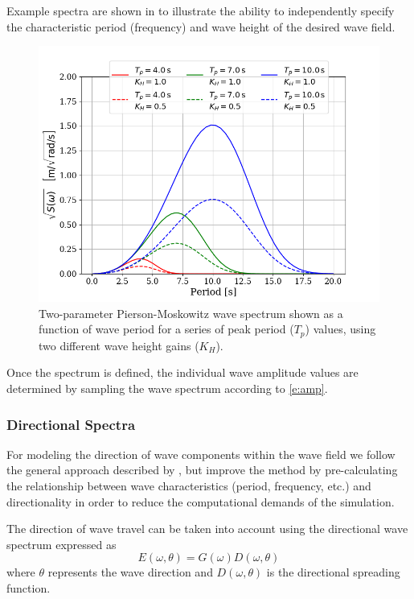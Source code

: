 \documentclass[utf8]{frontiersSCNS} %
\begin{document}
Example spectra are shown in  to illustrate the ability to independently specify the characteristic period (frequency) and wave height of the desired wave field.
\begin{figure}[hbt!]
  \centering
  \includegraphics[width=\SFc\textwidth]{src/pm_spectra_2.png}
  \caption{Two-parameter Pierson-Moskowitz wave spectrum shown as a function of wave period for a series of peak period ($T_p$) values, using two different wave height gains ($K_H$).}
  \label{f:pm}
\end{figure} 
Once the spectrum is defined, the individual wave amplitude values are determined by sampling the wave spectrum according to \eqref{e:amp}.

\subsubsection{Directional Spectra}
For modeling the direction of wave components within the wave field we follow the general approach described by \citet{frechot06realistic}, but improve the method by pre-calculating the relationship between wave characteristics (period, frequency, etc.) and directionality in order to reduce the computational demands of the simulation.

The direction of wave travel can be taken into account using the directional wave spectrum expressed as
\begin{equation}
  E(\omega,\theta)=G(\omega)D(\omega,\theta)
\end{equation}
where $\theta$ represents the wave direction and $D(\omega,\theta)$ is the directional spreading function. %
\end{document}
